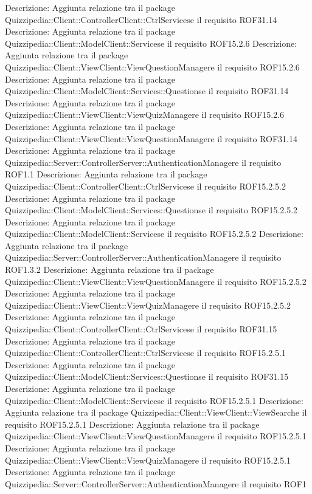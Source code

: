 Descrizione: Aggiunta relazione tra il package Quizzipedia::Client::ControllerClient::CtrlServicese il requisito ROF31.14 
Descrizione: Aggiunta relazione tra il package Quizzipedia::Client::ModelClient::Servicese il requisito ROF15.2.6 
Descrizione: Aggiunta relazione tra il package Quizzipedia::Client::ViewClient::ViewQuestionManagere il requisito ROF15.2.6 
Descrizione: Aggiunta relazione tra il package Quizzipedia::Client::ModelClient::Services::Questionse il requisito ROF31.14 
Descrizione: Aggiunta relazione tra il package Quizzipedia::Client::ViewClient::ViewQuizManagere il requisito ROF15.2.6 
Descrizione: Aggiunta relazione tra il package Quizzipedia::Client::ViewClient::ViewQuestionManagere il requisito ROF31.14 
Descrizione: Aggiunta relazione tra il package Quizzipedia::Server::ControllerServer::AuthenticationManagere il requisito ROF1.1 
Descrizione: Aggiunta relazione tra il package Quizzipedia::Client::ControllerClient::CtrlServicese il requisito ROF15.2.5.2 
Descrizione: Aggiunta relazione tra il package Quizzipedia::Client::ModelClient::Services::Questionse il requisito ROF15.2.5.2 
Descrizione: Aggiunta relazione tra il package Quizzipedia::Client::ModelClient::Servicese il requisito ROF15.2.5.2 
Descrizione: Aggiunta relazione tra il package Quizzipedia::Server::ControllerServer::AuthenticationManagere il requisito ROF1.3.2 
Descrizione: Aggiunta relazione tra il package Quizzipedia::Client::ViewClient::ViewQuestionManagere il requisito ROF15.2.5.2 
Descrizione: Aggiunta relazione tra il package Quizzipedia::Client::ViewClient::ViewQuizManagere il requisito ROF15.2.5.2 
Descrizione: Aggiunta relazione tra il package Quizzipedia::Client::ControllerClient::CtrlServicese il requisito ROF31.15 
Descrizione: Aggiunta relazione tra il package Quizzipedia::Client::ControllerClient::CtrlServicese il requisito ROF15.2.5.1 
Descrizione: Aggiunta relazione tra il package Quizzipedia::Client::ModelClient::Services::Questionse il requisito ROF31.15 
Descrizione: Aggiunta relazione tra il package Quizzipedia::Client::ModelClient::Servicese il requisito ROF15.2.5.1 
Descrizione: Aggiunta relazione tra il package Quizzipedia::Client::ViewClient::ViewSearche il requisito ROF15.2.5.1 
Descrizione: Aggiunta relazione tra il package Quizzipedia::Client::ViewClient::ViewQuestionManagere il requisito ROF15.2.5.1 
Descrizione: Aggiunta relazione tra il package Quizzipedia::Client::ViewClient::ViewQuizManagere il requisito ROF15.2.5.1 
Descrizione: Aggiunta relazione tra il package Quizzipedia::Server::ControllerServer::AuthenticationManagere il requisito ROF1 
